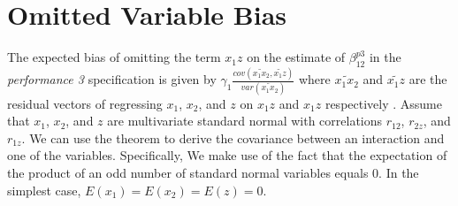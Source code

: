\documentclass[12pt]{article}
\begin{document}
%
%
%
%
%
%
%
%
%
%
\section{Omitted Variable Bias} \label{appendix-omitted}

The expected bias of omitting the term $x_1 z$ on the estimate of $\beta^{p3}_{12}$ in the \emph{performance 3} specification is given by $\gamma_1 \frac{cov(\widetilde{x_1 x_2}, \widetilde{x_1 z})} {var(\widetilde{x_1 x_2})}$ \citep{chenhall_issue_2007} where $\widetilde{x_1 x_2}$ and $\widetilde{x_1 z}$ are the residual vectors of regressing $x_1$, $x_2$, and $z$ on $x_1 z$ and $x_1 z$ respectively \citep{angrist2008mostly,cunningham_causal_2018}. 
Assume that $x_1$, $x_2$, and $z$ are multivariate standard normal with correlations $r_{12}$, $r_{2z}$, and $r_{1z}$. We can use the \citet{isserlis_formula_1918} theorem to derive the covariance between an interaction and one of the variables. Specifically, We make use of the fact that the expectation of the product of an odd number of standard normal variables equals 0. In the simplest case, $E(x_1) =  E(x_2) = E(z) = 0$.
\end{document}
